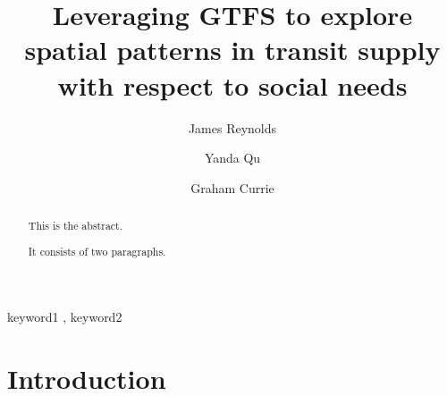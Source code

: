 \documentclass[preprint, 3p,
authoryear]{elsarticle} %
\begin{document}
\begin{frontmatter}

  \title{Leveraging GTFS to explore spatial patterns in transit supply
with respect to social needs}
    \author[Public Transport Research Group (PTRG)]{James Reynolds%
  }
    \author[Public Transport Research Group (PTRG)]{Yanda Qu%
  }
    \author[Public Transport Research Group (PTRG)]{Graham Currie%
  }
  
  \begin{abstract}
  This is the abstract.

  It consists of two paragraphs.
  \end{abstract}
    \begin{keyword}
    keyword1 \sep 
    keyword2
  \end{keyword}
  
 \end{frontmatter}

\hypertarget{introduction}{%
\section{Introduction}\label{introduction}}
\end{document}
